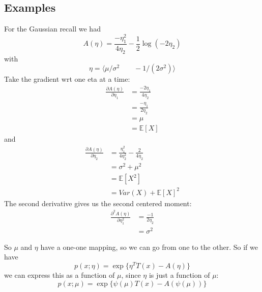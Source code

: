 \documentclass{article}
\newcommand{\E}{\mathbb{E}}
\begin{document}
\subsection{Examples}

For the Gaussian recall we had
$$
	A(\eta) = 
	\frac{-\eta_1^2}
	{4\eta_2}
	-
	\frac{1}{2} \log(-2\eta_2)
$$
with 
$$
	\eta = \langle
	\mu/\sigma^2
	\qquad
	-1/(2\sigma^2)
	 \rangle
$$
Take the gradient wrt one eta at a time:
\begin{align*}
\frac{\partial A(\eta)}
{\partial \eta_1}
&=
\frac{-2\eta_1}
{4\eta_2}
\\
&=
\frac{-\eta_1}
{2\eta_2}
\\
&=
\mu
\\
&=
\E[X]
\end{align*}
and
\begin{align*}
\frac{\partial A(\eta)}
{\partial \eta_2}
&=
\frac{\eta_1^2}
{4\eta_2^2}
-
\frac{2}
{4\eta_2}
\\
&=
\sigma^2 + \mu^2
\\
&=
\E[X^2]
\\
&=
Var(X)
+
\E[X]^2
\end{align*}
The second derivative gives us the second centered moment:
\begin{align*}
\frac{\partial^2 A(\eta)}
{\partial \eta_1^2}
&=
\frac{-1}
{2\eta_2}
\\
&=
\sigma^2
\end{align*}

So $\mu$ and $\eta$ have a one-one mapping, so we can go from one to the other.
So if we have
$$
p(x;\eta)
=
\exp\{
\eta^T T(x) - A(\eta)
\}
$$
we can express this as a function of $\mu$, since $\eta$ is just a function of $\mu$:
$$
p(x;\mu)
=
\exp\{
\psi(\mu) T(x) - A(\psi(\mu))
\}
$$
\end{document}
